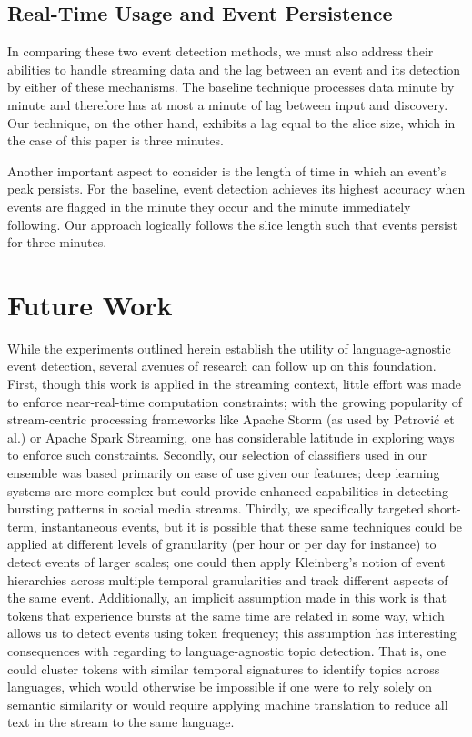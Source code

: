 \documentclass{acm_proc_article-sp}
\begin{document}
\subsection{Real-Time Usage and Event Persistence}

In comparing these two event detection methods, we must also address their abilities to handle streaming data and the lag between an event and its detection by either of these mechanisms.
The baseline technique processes data minute by minute and therefore has at most a minute of lag between input and discovery.
Our technique, on the other hand, exhibits a lag equal to the slice size, which in the case of this paper is three minutes.

Another important aspect to consider is the length of time in which an event's peak persists.
For the baseline, event detection achieves its highest accuracy when events are flagged in the minute they occur and the minute immediately following.
Our approach logically follows the slice length such that events persist for three minutes.

\section{Future Work}
\label{sect:future}

While the experiments outlined herein establish the utility of language-agnostic event detection, several avenues of research can follow up on this foundation.
First, though this work is applied in the streaming context, little effort was made to enforce near-real-time computation constraints; with the growing popularity of stream-centric processing frameworks like Apache Storm (as used by Petrovi\'{c} et al.) or Apache Spark Streaming, one has considerable latitude in exploring ways to enforce such constraints.
Secondly, our selection of classifiers used in our ensemble was based primarily on ease of use given our features; deep learning systems are more complex but could provide enhanced capabilities in detecting bursting patterns in social media streams.
Thirdly, we specifically targeted short-term, instantaneous events, but it is possible that these same techniques could be applied at different levels of granularity (per hour or per day for instance) to detect events of larger scales; one could then apply Kleinberg's notion of event hierarchies across multiple temporal granularities and track different aspects of the same event.
Additionally, an implicit assumption made in this work is that tokens that experience bursts at the same time are related in some way, which allows us to detect events using token frequency; this assumption has interesting consequences with regarding to language-agnostic topic detection.
That is, one could cluster tokens with similar temporal signatures to identify topics across languages, which would otherwise be impossible if one were to rely solely on semantic similarity or would require applying machine translation to reduce all text in the stream to the same language.
\end{document}
